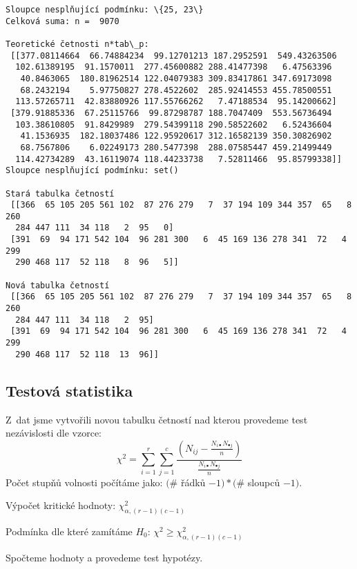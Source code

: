 \documentclass[11pt]{article}
\begin{document}
    \begin{Verbatim}[commandchars=\\\{\}]
Sloupce nesplňující podmínku: \{25, 23\}
Celková suma: n =  9070

Teoretické četnosti n*tab\_p:
 [[377.08114664  66.74884234  99.12701213 187.2952591  549.43263506
  102.61389195  91.1570011  277.45600882 288.41477398   6.47563396
   40.8463065  180.81962514 122.04079383 309.83417861 347.69173098
   68.2432194    5.97750827 278.4522602  285.92414553 455.78500551
  113.57265711  42.83880926 117.55766262   7.47188534  95.14200662]
 [379.91885336  67.25115766  99.87298787 188.7047409  553.56736494
  103.38610805  91.8429989  279.54399118 290.58522602   6.52436604
   41.1536935  182.18037486 122.95920617 312.16582139 350.30826902
   68.7567806    6.02249173 280.5477398  288.07585447 459.21499449
  114.42734289  43.16119074 118.44233738   7.52811466  95.85799338]]
Sloupce nesplňující podmínku: set()

Stará tabulka četností
 [[366  65 105 205 561 102  87 276 279   7  37 194 109 344 357  65   8 260
  284 447 111  34 118   2  95   0]
 [391  69  94 171 542 104  96 281 300   6  45 169 136 278 341  72   4 299
  290 468 117  52 118   8  96   5]]

Nová tabulka četností
 [[366  65 105 205 561 102  87 276 279   7  37 194 109 344 357  65   8 260
  284 447 111  34 118   2  95]
 [391  69  94 171 542 104  96 281 300   6  45 169 136 278 341  72   4 299
  290 468 117  52 118  13  96]]

    \end{Verbatim}

    \subsection*{Testová statistika}\label{testovuxe1-statistika}

Z~dat jsme vytvořili novou tabulku četností nad kterou provedeme test
nezávislosti dle vzorce:
\[ \chi^{2}  = \sum_{i=1}^{r} \sum_{j=1}^{c} \frac{(N_{ij} - \frac{ N_{i\bullet}N_{\bullet j}}{n})}{\frac{ N_{i\bullet}N_{\bullet j}}{n} } \]
Počet stupňů volnosti počítáme jako: \((\#\) řádků \(- 1) * (\#\)
sloupců \(- 1)\).

\noindent
Výpočet kritické hodnoty: \(\chi_{\alpha,(r-1)(c-1)}^{2}\)

\noindent
Podmínka dle které zamítáme \(H_0\): \(\chi^{2} \geq \chi_{\alpha,(r-1)(c-1)}^{2}\)

\noindent
Spočteme hodnoty a provedeme test hypotézy.
\end{document}
